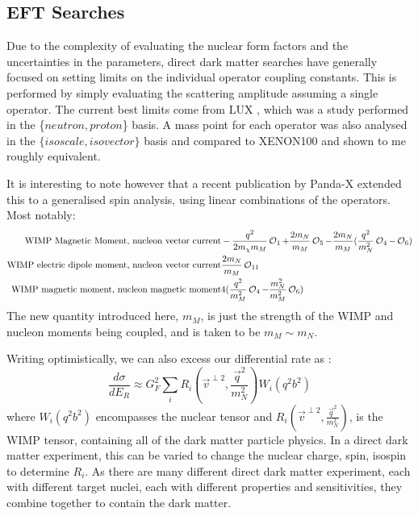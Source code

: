 \subsection{EFT Searches}
\par
Due to the complexity of evaluating the nuclear form factors and the uncertainties in the parameters, direct dark matter searches have generally focused on setting limits on the individual operator coupling constants.
This is performed by simply evaluating the scattering amplitude assuming a single operator.
The current best limits come from LUX \cite{LUX_RUN4_EFT_2021}, which was a study performed in the \{$neutron,proton$\} basis.
A mass point for each operator was also analysed in the $\{isoscale, isovector\}$ basis and compared to XENON100 \cite{xenon100_eft_ref} and shown to me roughly equivalent.

\par
It is interesting to note however that a recent publication by Panda-X extended this to a generalised spin analysis, using linear combinations of the operators.
Most notably:
\begin{equation}
\begin{split}
    \text{WIMP Magnetic Moment, nucleon vector current} & -\frac{q^2}{2m_\chi m_M}\operatorname{\mathcal{O}}_1 + \frac{2m_N}{m_M}\operatorname{\mathcal{O}}_5 - \frac{2m_N}{m_M}(\frac{q^2}{m_N^2}\operatorname{\mathcal{O}}_4 - \operatorname{\mathcal{O}}_6) \\
    \text{WIMP electric dipole moment, nucleon vector current} & \frac{2m_N}{m_M}\operatorname{\mathcal{O}}_{11} \\
    \text{WIMP magnetic moment, nucleon magnetic moment} & 4(\frac{q^2}{m_M^2}\operatorname{\mathcal{O}}_4 - \frac{m_N^2}{m_M^2}\operatorname{\mathcal{O}}_6)
\end{split}
\end{equation}
The new quantity introduced here, $m_M$, is just the strength of the WIMP and nucleon moments being coupled, and is taken to be $m_M \sim m_N$.

\par
Writing optimistically, we can also excess our differential rate as \cite{simple_eft_ref}:
\begin{equation}
    \frac{d\sigma}{dE_R} \approx G_F^2 \sum_{i} R_i (\vec{v}^{\perp 2}, \frac{\vec{q}^2}{m_N^2}) W_i(q^2b^2)
\end{equation}
where $W_i(q^2b^2)$ encompasses the nuclear tensor and $R_i (\vec{v}^{\perp 2}, \frac{\vec{q}^2}{m_N^2})$, is the WIMP tensor, containing all of the dark matter particle physics.
In a direct dark matter experiment, this can be varied to change the nuclear charge, spin, isospin to determine $R_i$.
As there are many different direct dark matter experiment, each with different target nuclei, each with different properties and sensitivities, they combine together to contain the dark matter.

\fi